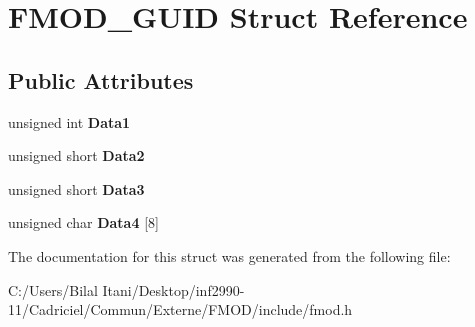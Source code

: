 \hypertarget{struct_f_m_o_d___g_u_i_d}{}\section{F\+M\+O\+D\+\_\+\+G\+U\+ID Struct Reference}
\label{struct_f_m_o_d___g_u_i_d}
\subsection*{Public Attributes}
\begin{DoxyCompactItemize}
\item 
unsigned int {\bfseries Data1}\hypertarget{struct_f_m_o_d___g_u_i_d_ade5cc5a3c9665147a488c8a9e2ea211c}{}\label{struct_f_m_o_d___g_u_i_d_ade5cc5a3c9665147a488c8a9e2ea211c}

\item 
unsigned short {\bfseries Data2}\hypertarget{struct_f_m_o_d___g_u_i_d_ac5805cdbaf5cfa2113d637e11f6ad36e}{}\label{struct_f_m_o_d___g_u_i_d_ac5805cdbaf5cfa2113d637e11f6ad36e}

\item 
unsigned short {\bfseries Data3}\hypertarget{struct_f_m_o_d___g_u_i_d_a98f6f2f06cad235236cbc86099aa4e96}{}\label{struct_f_m_o_d___g_u_i_d_a98f6f2f06cad235236cbc86099aa4e96}

\item 
unsigned char {\bfseries Data4} \mbox{[}8\mbox{]}\hypertarget{struct_f_m_o_d___g_u_i_d_a3a1337ea3f0bec8fbddd197ebdb29cf7}{}\label{struct_f_m_o_d___g_u_i_d_a3a1337ea3f0bec8fbddd197ebdb29cf7}

\end{DoxyCompactItemize}


The documentation for this struct was generated from the following file\+:\begin{DoxyCompactItemize}
\item 
C\+:/\+Users/\+Bilal Itani/\+Desktop/inf2990-\/11/\+Cadriciel/\+Commun/\+Externe/\+F\+M\+O\+D/include/fmod.\+h\end{DoxyCompactItemize}
